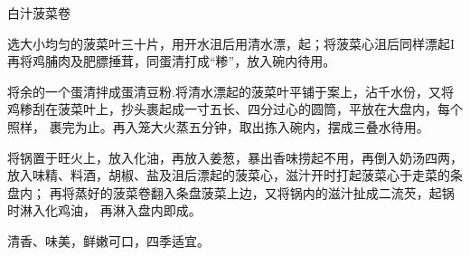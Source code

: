 \begin{recipe}{白汁菠菜卷}

\ingredients


\cooking

\step 选大小均匀的菠菜叶三十片，用开水沮后用清水漂，起；将菠菜心沮后同样漂起I
再将鸡脯肉及肥膘捶茸，同蛋清打成“糁”，放入碗内待用。

\step 将余的一个蛋清拌成蛋清豆粉.将清水漂起的菠菜叶平铺于案上，沾千水份，又将
鸡糁刮在菠菜叶上，抄头裹起成一寸五长、四分过心的圆筒，平放在大盘内，每个照样，
裹完为止。再入笼大火蒸五分钟，取出拣入碗内，摆成三叠水待用。

\step 将锅置于旺火上，放入化油，再放入姜葱，暴出香味捞起不用，再倒入奶汤四两，
放入味精、料酒，胡椒、盐及沮后漂起的菠菜心，滋汁开时打起菠菜心于走菜的条盘内；
再将蒸好的菠菜卷翻入条盘菠菜上边，又将锅内的滋汁扯成二流芡，起锅时淋入化鸡油，
再淋入盘内即成。

\notes

清香、味美，鲜嫩可口，四季适宜。

\end{recipe}

